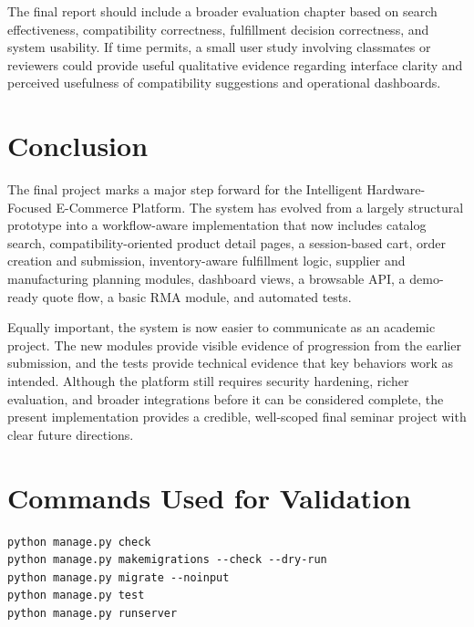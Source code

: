 \documentclass[12pt,letterpaper,oneside,openany]{book}
\begin{document}
\begin{justifying}
The final report should include a broader evaluation chapter based on search
effectiveness, compatibility correctness, fulfillment decision correctness, and
system usability. If time permits, a small user study involving classmates or
reviewers could provide useful qualitative evidence regarding interface clarity
and perceived usefulness of compatibility suggestions and operational
dashboards.
\end{justifying}

\chapter{Conclusion}

\begin{justifying}
The final project marks a major step forward for the Intelligent
Hardware-Focused E-Commerce Platform. The system has evolved from a largely
structural prototype into a workflow-aware implementation that now includes
catalog search, compatibility-oriented product detail pages, a session-based
cart, order creation and submission, inventory-aware fulfillment logic,
supplier and manufacturing planning modules, dashboard views, a browsable API,
a demo-ready quote flow, a basic RMA module, and automated tests.
\end{justifying}

\begin{justifying}
Equally important, the system is now easier to communicate as an academic
project. The new modules provide visible evidence of progression from the
earlier submission, and the tests provide technical evidence that key behaviors
work as intended. Although the platform still requires security hardening,
richer evaluation, and broader integrations before it can be considered
complete, the present implementation provides a credible, well-scoped final
seminar project with clear future directions.
\end{justifying}

\appendix

\chapter{Commands Used for Validation}

\begin{lstlisting}[caption={Framework and validation commands},label={lst:commands}]
python manage.py check
python manage.py makemigrations --check --dry-run
python manage.py migrate --noinput
python manage.py test
python manage.py runserver
\end{lstlisting}
\end{document}

